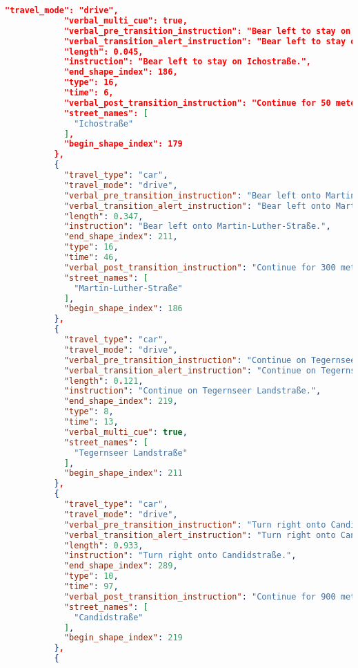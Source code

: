 \begin{lstlisting}[language=json,breaklines=true]
            "travel_mode": "drive",
            "verbal_multi_cue": true,
            "verbal_pre_transition_instruction": "Bear left to stay on Ichostraße. Then Bear left onto Martin-Luther-Straße.",
            "verbal_transition_alert_instruction": "Bear left to stay on Ichostraße.",
            "length": 0.045,
            "instruction": "Bear left to stay on Ichostraße.",
            "end_shape_index": 186,
            "type": 16,
            "time": 6,
            "verbal_post_transition_instruction": "Continue for 50 meters.",
            "street_names": [
              "Ichostraße"
            ],
            "begin_shape_index": 179
          },
          {
            "travel_type": "car",
            "travel_mode": "drive",
            "verbal_pre_transition_instruction": "Bear left onto Martin-Luther-Straße.",
            "verbal_transition_alert_instruction": "Bear left onto Martin-Luther-Straße.",
            "length": 0.347,
            "instruction": "Bear left onto Martin-Luther-Straße.",
            "end_shape_index": 211,
            "type": 16,
            "time": 46,
            "verbal_post_transition_instruction": "Continue for 300 meters.",
            "street_names": [
              "Martin-Luther-Straße"
            ],
            "begin_shape_index": 186
          },
          {
            "travel_type": "car",
            "travel_mode": "drive",
            "verbal_pre_transition_instruction": "Continue on Tegernseer Landstraße for 100 meters. Then Turn right onto Candidstraße.",
            "verbal_transition_alert_instruction": "Continue on Tegernseer Landstraße.",
            "length": 0.121,
            "instruction": "Continue on Tegernseer Landstraße.",
            "end_shape_index": 219,
            "type": 8,
            "time": 13,
            "verbal_multi_cue": true,
            "street_names": [
              "Tegernseer Landstraße"
            ],
            "begin_shape_index": 211
          },
          {
            "travel_type": "car",
            "travel_mode": "drive",
            "verbal_pre_transition_instruction": "Turn right onto Candidstraße.",
            "verbal_transition_alert_instruction": "Turn right onto Candidstraße.",
            "length": 0.933,
            "instruction": "Turn right onto Candidstraße.",
            "end_shape_index": 289,
            "type": 10,
            "time": 97,
            "verbal_post_transition_instruction": "Continue for 900 meters.",
            "street_names": [
              "Candidstraße"
            ],
            "begin_shape_index": 219
          },
          {

\end{lstlisting}
